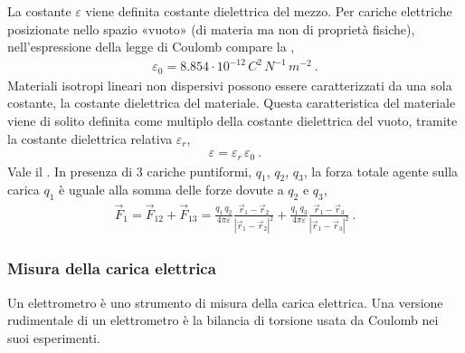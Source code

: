\documentclass[letterpaper,10pt,italian]{jupyterBook}
\begin{document}
\sphinxAtStartPar
La costante \(\varepsilon\) viene definita costante dielettrica del mezzo. Per cariche elettriche posizionate nello spazio «vuoto» (di materia ma non di proprietà fisiche), nell’espressione della legge di Coulomb compare la ,
\begin{equation*}
\begin{split}\varepsilon_0 = 8.854 \cdot 10^{-12} \, C^2 \, N^{-1} \, m^{-2} \ .\end{split}
\end{equation*}
\sphinxAtStartPar
Materiali isotropi lineari non dispersivi possono essere caratterizzati da una sola costante, la costante dielettrica del materiale. Questa caratteristica del materiale viene di solito definita come multiplo della costante dielettrica del vuoto, tramite la costante dielettrica relativa \(\varepsilon_r\),
\begin{equation*}
\begin{split}\varepsilon = \varepsilon_r \,\varepsilon_0 \ . \end{split}
\end{equation*}
\sphinxAtStartPar
Vale il . In presenza di 3 cariche puntiformi, \(q_1\), \(q_2\), \(q_3\), la forza totale agente sulla carica \(q_1\) è uguale alla somma delle forze dovute a \(q_2\) e \(q_3\),
\begin{equation*}
\begin{split}\vec{F}_1 = \vec{F}_{12} + \vec{F}_{13} = \frac{q_1 \, q_2}{4 \pi \varepsilon}\frac{\vec{r}_1 - \vec{r}_2}{|\vec{r}_1 - \vec{r}_2|^2} +  \frac{q_1 \, q_3}{4 \pi \varepsilon}\frac{\vec{r}_1 - \vec{r}_3}{|\vec{r}_1 - \vec{r}_3|^2} \ .\end{split}
\end{equation*}
\begin{figure}[htbp]
\centering

\noindent{}
\end{figure}




\subsubsection{Misura della carica elettrica}
\label{\detokenize{ch/electromagnetism/electrostatics:misura-della-carica-elettrica}}\label{\detokenize{ch/electromagnetism/electrostatics:physics-hs-electromagnetism-electrostatics-charge-measurement}}
\sphinxAtStartPar
Un elettrometro è uno strumento di misura della carica elettrica. Una versione rudimentale di un elettrometro è la bilancia di torsione usata da Coulomb nei suoi esperimenti.
\end{document}
